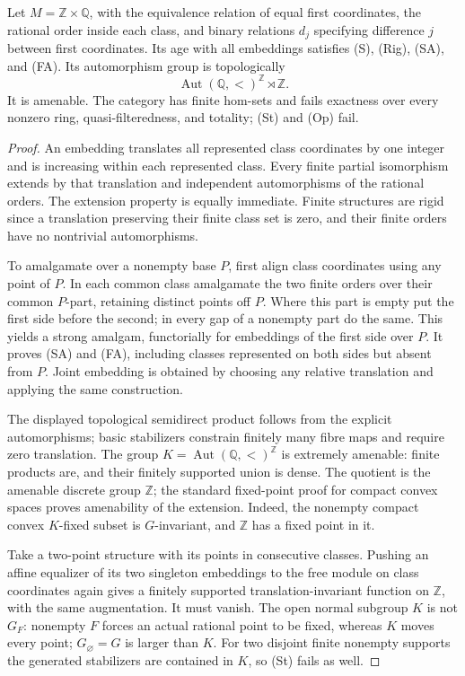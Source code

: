 \begin{example}\label{A:fibred-translation}
Let $M=\mathbb Z\times\mathbb Q$, with the equivalence relation of
equal first coordinates, the rational order inside each class, and
binary relations $d_j$ specifying difference $j$ between first
coordinates. Its age with all embeddings satisfies (S), (Rig), (SA),
and (FA). Its automorphism group is topologically
\[
 \operatorname{Aut}(\mathbb Q,<)^{\mathbb Z}\rtimes\mathbb Z.
\]
It is amenable. The category has finite hom-sets and fails exactness
over every nonzero ring, quasi-filteredness, and totality; (St) and
(Op) fail.
\end{example}
\begin{proof}
An embedding translates all represented class coordinates by one
integer and is increasing within each represented class. Every finite
partial isomorphism extends by that translation and independent
automorphisms of the rational orders. The extension property is
equally immediate. Finite structures are rigid since a translation
preserving their finite class set is zero, and their finite orders
have no nontrivial automorphisms.

To amalgamate over a nonempty base $P$, first align class coordinates
using any point of $P$. In each common class amalgamate the two finite
orders over their common $P$-part, retaining distinct points off $P$.
Where this part is empty put the first side before the second; in
every gap of a nonempty part do the same. This yields a strong
amalgam, functorially for embeddings of the first side over $P$.
It proves (SA) and (FA), including classes represented on both sides
but absent from $P$. Joint embedding is obtained by choosing any
relative translation and applying the same construction.

The displayed topological semidirect product follows from the
explicit automorphisms; basic stabilizers constrain finitely many
fibre maps and require zero translation. The group
$K=\operatorname{Aut}(\mathbb Q,<)^{\mathbb Z}$ is extremely amenable:
finite products are, and their finitely supported union is dense.
The quotient is the amenable discrete group $\mathbb Z$; the standard
fixed-point proof for compact convex spaces proves amenability of the
extension. Indeed, the nonempty compact convex $K$-fixed subset is
$G$-invariant, and $\mathbb Z$ has a fixed point in it.

Take a two-point structure with its points in consecutive classes.
Pushing an affine equalizer of its two singleton embeddings to the
free module on class coordinates again gives a finitely supported
translation-invariant function on $\mathbb Z$, with the same
augmentation. It must vanish. The open normal subgroup $K$ is not
$G_F$: nonempty $F$ forces an actual rational point to be fixed,
whereas $K$ moves every point; $G_\varnothing=G$ is larger than $K$.
For two disjoint finite nonempty supports the generated stabilizers
are contained in $K$, so (St) fails as well.
\end{proof}

